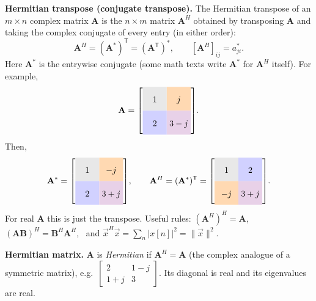 \documentclass[handout_subfiles_root.tex]{subfiles}
\newcommand{\HandoutCell}[2]{\cellcolor{#1}\rule[-1.0em]{0pt}{2.8em}{#2}}
\newenvironment{shadedbmatrix}{\left[\renewcommand{\arraystretch}{1}\setlength{\arraycolsep}{0pt}\begin{array}{w{c}{2.8em}w{c}{2.8em}}}{\end{array}\right]}
\begin{document}
\begin{notebox}[title={\texorpdfstring{Hermitian transpose and Hermitian matrices\hfill\normalfont\small\textit{(addendum to orig lecture note)}}{Hermitian transpose and Hermitian matrices (addendum)}}]
\textbf{Hermitian transpose (conjugate transpose).} The Hermitian transpose of an $m\times n$ complex matrix $\mathbf{A}$ is the $n\times m$ matrix $\mathbf{A}^H$ obtained by transposing $\mathbf{A}$ and taking the complex conjugate of every entry (in either order):
\begin{equation*}
\mathbf{A}^H = (\mathbf{A}^{*})^{\mathsf T} = (\mathbf{A}^{\mathsf T})^{*}, \qquad [\mathbf{A}^H]_{ij} = a_{ji}^{*}.
\end{equation*}
Here $\mathbf{A}^{*}$ is the entrywise conjugate (some math texts write $\mathbf{A}^{*}$ for $\mathbf{A}^H$ itself).
For example,
\begin{equation*}
\mathbf{A}=
\begin{shadedbmatrix}
\HandoutCell{gray!18}{1} & \HandoutCell{orange!30}{j}\\
\HandoutCell{ee483link!18}{2} & \HandoutCell{violet!18}{3-j}
\end{shadedbmatrix}.
\end{equation*}
Then,
\begin{equation*}
\mathbf{A}^*=
\begin{shadedbmatrix}
\HandoutCell{gray!18}{1} & \HandoutCell{orange!30}{-j}\\
\HandoutCell{ee483link!18}{2} & \HandoutCell{violet!18}{3+j}
\end{shadedbmatrix},
\qquad
\mathbf{A}^H=(\mathbf{A}^*)^{\mathsf T}=
\begin{shadedbmatrix}
\HandoutCell{gray!18}{1} & \HandoutCell{ee483link!18}{2}\\
\HandoutCell{orange!30}{-j} & \HandoutCell{violet!18}{3+j}
\end{shadedbmatrix}.
\end{equation*}
For real $\mathbf{A}$ this is just the transpose. Useful rules: $(\mathbf{A}^H)^H = \mathbf{A}$, \ $(\mathbf{A}\mathbf{B})^H = \mathbf{B}^H\mathbf{A}^H$, \ and $\vec{x}^H\vec{x} = \sum_n |x[n]|^2 = \|\vec{x}\|^2$.

\medskip
\textbf{Hermitian matrix.} $\mathbf{A}$ is \emph{Hermitian} if $\mathbf{A}^H = \mathbf{A}$ (the complex analogue of a symmetric matrix), e.g.\ $\begin{bmatrix} 2 & 1-j \\ 1+j & 3 \end{bmatrix}$. Its diagonal is real and its eigenvalues are real.

\end{notebox}
\end{document}
